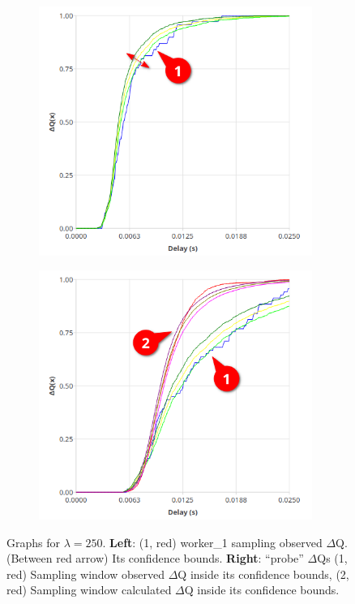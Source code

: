        \begin{figure}[H]
            \centering
            \begin{subfigure}{.5\textwidth}
                \centering
                \includegraphics[width=0.98\textwidth]{img/overload_2/250_workera.png}
                \label{fig:high_load_1}
            \end{subfigure}%
            \begin{subfigure}{.5\textwidth}
                \centering
                \includegraphics[width =0.98\textwidth]{img/overload_2/250_probe2.png}
                \label{fig:high_load_2}
            \end{subfigure}
            \caption{Graphs for $\lambda = 250$. \textbf{Left}: (1, red) worker\_1 sampling observed $\Delta$Q. (Between red arrow) Its confidence bounds.
            \textbf{Right}: ``probe'' $\Delta$Qs (1, red) Sampling window observed $\Delta$Q inside its confidence bounds, (2, red) Sampling window calculated $\Delta$Q inside its confidence bounds.}%
            \label{fig:early_ov}
        \end{figure} 
